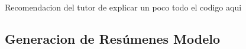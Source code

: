 Recomendacion del tutor de explicar un poco todo el codigo aqui
\subsection{Generacion de Resúmenes Modelo}

\label{apendice:codigo:crear_json_batch}

\label{apendice:codigo:subir_batch}

\label{apendice:codigo:estado_batch}

\label{apendice:codigo:recuperar_batch}

\label{apendice:codigo:respuesta_json2archivos}
